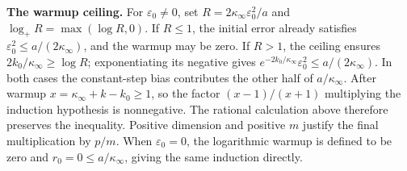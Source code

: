 \documentclass[11pt,a4paper]{report}
\begin{document}
\textbf{The warmup ceiling.} For \(\varepsilon_0\ne0\), set \(R=2\kappa_\infty\varepsilon_0^2/a\) and \(\log_+R=\max(\log R,0)\). If \(R\le1\), the initial error already satisfies \(\varepsilon_0^2\le a/(2\kappa_\infty)\), and the warmup may be zero. If \(R>1\), the ceiling ensures \(2k_0/\kappa_\infty\ge\log R\); exponentiating its negative gives \(e^{-2k_0/\kappa_\infty}\varepsilon_0^2\le a/(2\kappa_\infty)\). In both cases the constant-step bias contributes the other half of \(a/\kappa_\infty\). After warmup \(x=\kappa_\infty+k-k_0\ge1\), so the factor \((x-1)/(x+1)\) multiplying the induction hypothesis is nonnegative. The rational calculation above therefore preserves the inequality. Positive dimension and positive \(m\) justify the final multiplication by \(p/m\). When \(\varepsilon_0=0\), the logarithmic warmup is defined to be zero and \(r_0=0\le a/\kappa_\infty\), giving the same induction directly.
\end{document}
